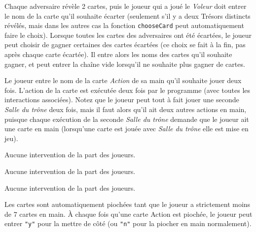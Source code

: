 \documentclass[12pt]{td}
\begin{document}
{Chaque adversaire révèle 2 cartes, puis le joueur qui a joué le \emph{Voleur} doit entrer le nom de la carte qu'il souhaite écarter (seulement s'il y a deux Trésors distincts révélés, mais dans les autres cas la fonction \texttt{chooseCard} peut automatiquement faire le choix). Lorsque toutes les cartes des adversaires ont été écartées, le joueur peut choisir de gagner certaines des cartes écartées (ce choix se fait à la fin, pas après chaque carte écartée). Il entre alors les noms des cartes qu'il souhaite gagner, et peut entrer la chaîne vide lorsqu'il ne souhaite plus gagner de cartes.}

{Le joueur entre le nom de la carte \emph{Action} de sa main qu'il souhaite jouer deux fois. L'action de la carte est exécutée deux fois par le programme (avec toutes les interactions associées). Notez que le joueur peut tout à fait jouer une seconde \emph{Salle du trône} deux fois, mais il faut alors qu'il ait deux autres actions en main, puisque chaque exécution de la seconde \emph{Salle du trône} demande que le joueur ait une carte en main (lorsqu'une carte est jouée avec \emph{Salle du trône} elle est mise en jeu).}

{Aucune intervention de la part des joueurs.}

{Aucune intervention de la part des joueurs.}

{Aucune intervention de la part des joueurs.}

{Les cartes sont automatiquement piochées tant que le joueur a strictement moins de 7 cartes en main. À chaque fois qu'une carte Action est piochée, le joueur peut entrer \texttt{"y"} pour la mettre de côté (ou \texttt{"n"} pour la piocher en main normalement).}
\end{document}
